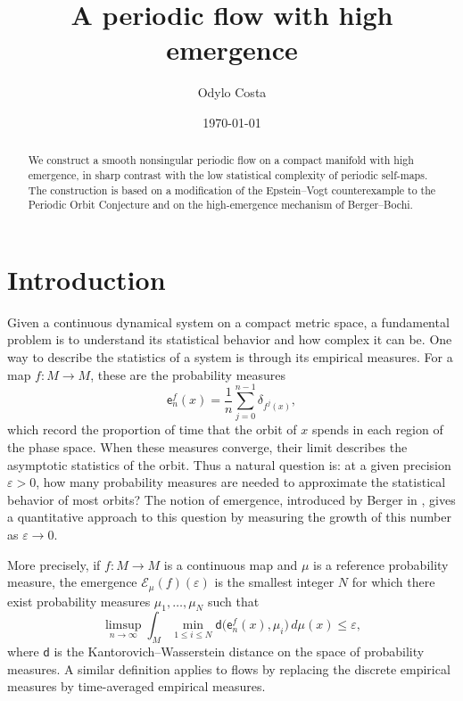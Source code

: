 \documentclass[11pt,reqno]{amsart}
\title[A periodic flow with high emergence]{A periodic flow with high emergence}
\author{Odylo Costa}
\date{\today}
\theoremstyle{plain}
\theoremstyle{definition}
\theoremstyle{remark}
\theoremstyle{plain}
\numberwithin{equation}{section}
\begin{document}
\begin{abstract}
We construct a smooth nonsingular periodic flow on a compact manifold with high emergence, in sharp contrast with the low statistical complexity of periodic self-maps. The construction is based on a modification of the Epstein--Vogt counterexample to the Periodic Orbit Conjecture and on the high-emergence mechanism of Berger--Bochi.
\end{abstract}

\maketitle


\section{Introduction}

Given a continuous dynamical system on a compact metric space, a fundamental problem is to understand its statistical behavior and how complex it can be. One way to describe the statistics of a system is through its empirical measures. For a map $f\colon M\to M$, these are the probability measures
\begin{equation*}
\mathsf e_n^f(x)
=
\frac1n\sum_{j=0}^{n-1}\delta_{f^j(x)},
\end{equation*}
which record the proportion of time that the orbit of $x$ spends in each region of the phase space. When these measures converge, their limit describes the asymptotic statistics of the orbit. Thus a natural question is: at a given precision $\varepsilon>0$, how many probability measures are needed to approximate the statistical behavior of most orbits? The notion of emergence, introduced by Berger in \cite{berger2017emergence}, gives a quantitative approach to this question by measuring the growth of this number as $\varepsilon\to0$.

More precisely, if $f\colon M\to M$ is a continuous map and $\mu$ is a reference probability measure, the emergence $\mathcal E_\mu(f)(\varepsilon)$ is the smallest integer $N$ for which there exist probability measures $\mu_1,\dots,\mu_N$ such that
\begin{equation*}
\limsup_{n\to\infty}
\int_M
\min_{1\le i\le N}
\mathsf d\bigl(\mathsf e_n^f(x),\mu_i\bigr)\,d\mu(x)
\le \varepsilon,
\end{equation*}
where $\mathsf d$ is the Kantorovich--Wasserstein distance on the space of probability measures. A similar definition applies to flows by replacing the discrete empirical measures by time-averaged empirical measures.
\end{document}
